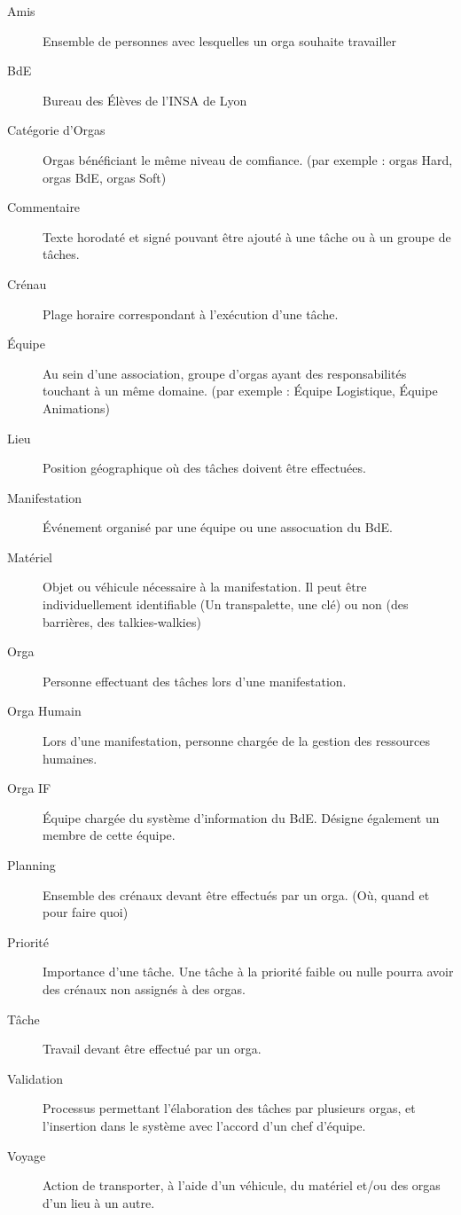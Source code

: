 \begin{description}
\item[Amis] Ensemble de personnes avec lesquelles un orga souhaite travailler 
\item[BdE] Bureau des Élèves de l'INSA de Lyon
\item[Catégorie d'Orgas] Orgas bénéficiant le même niveau de comfiance. (par exemple : orgas Hard, orgas BdE, orgas Soft)
\item[Commentaire] Texte horodaté et signé pouvant être ajouté à une tâche ou à un groupe de tâches.
\item[Crénau] Plage horaire correspondant à l'exécution d'une tâche.
\item[Équipe] Au sein d'une association, groupe d'orgas ayant des responsabilités touchant à un même domaine. (par exemple : Équipe Logistique, Équipe Animations)
\item[Lieu] Position géographique où des tâches doivent être effectuées.
\item[Manifestation] Événement organisé par une équipe ou une assocuation du BdE.
\item[Matériel] Objet ou véhicule nécessaire à la manifestation. Il peut être individuellement identifiable (Un transpalette, une clé) ou non (des barrières, des talkies-walkies)
\item[Orga] Personne effectuant des tâches lors d'une manifestation.
\item[Orga Humain] Lors d'une manifestation, personne chargée de la gestion des ressources humaines.
\item[Orga IF] Équipe chargée du système d'information du BdE. Désigne également un membre de cette équipe.
\item[Planning] Ensemble des crénaux devant être effectués par un orga. (Où, quand et pour faire quoi)
\item[Priorité] Importance d'une tâche. Une tâche à la priorité faible ou nulle pourra avoir des crénaux non assignés à des orgas.
\item[Tâche] Travail devant être effectué par un orga.
\item[Validation] Processus permettant l'élaboration des tâches par plusieurs orgas, et l'insertion dans le système avec l'accord d'un chef d'équipe.
\item[Voyage] Action de transporter, à l'aide d'un véhicule, du matériel et/ou des orgas d'un lieu à un autre.


 \end{description}